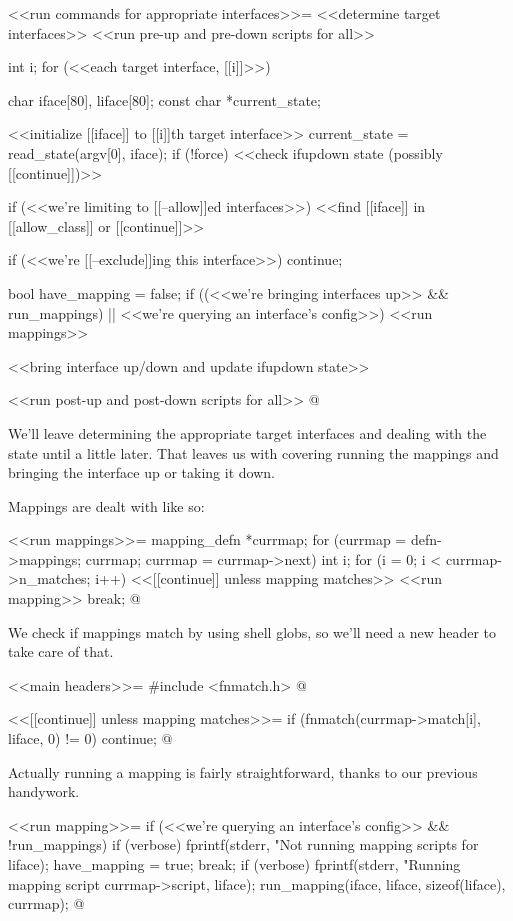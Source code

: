 \documentclass{article}
\begin{document}
<<run commands for appropriate interfaces>>=
<<determine target interfaces>>
<<run pre-up and pre-down scripts for all>>
{
	int i;
	for (<<each target interface, [[i]]>>) {
		char iface[80], liface[80];
		const char *current_state;

		<<initialize [[iface]] to [[i]]th target interface>>
		current_state = read_state(argv[0], iface);
		if (!force) {
			<<check ifupdown state (possibly [[continue]])>>
		}

		if (<<we're limiting to [[--allow]]ed interfaces>>) {
			<<find [[iface]] in [[allow_class]] or [[continue]]>>
		}

		if (<<we're [[--exclude]]ing this interface>>)  
			continue;

		bool have_mapping = false;
		if ((<<we're bringing interfaces up>> && run_mappings) || <<we're querying an interface's config>>) {
			<<run mappings>>
		}

		<<bring interface up/down and update ifupdown state>>
	}
}
<<run post-up and post-down scripts for all>>
@

We'll leave determining the appropriate target interfaces and dealing
with the state until a little later. That leaves us with covering running
the mappings and bringing the interface up or taking it down.

Mappings are dealt with like so:

<<run mappings>>=
{
	mapping_defn *currmap;
	for (currmap = defn->mappings; currmap; currmap = currmap->next) {
		int i;
		for (i = 0; i < currmap->n_matches; i++) {
			<<[[continue]] unless mapping matches>>
			<<run mapping>>
			break;
		}
	}
}
@

We check if mappings match by using shell globs, so we'll need a new header
to take care of that.

<<main headers>>=
#include <fnmatch.h>
@ 

<<[[continue]] unless mapping matches>>=
if (fnmatch(currmap->match[i], liface, 0) != 0)
	continue;
@

Actually running a mapping is fairly straightforward, thanks to our
previous handywork.

<<run mapping>>=
if (<<we're querying an interface's config>> && !run_mappings) {
	if (verbose) {
		fprintf(stderr, "Not running mapping scripts for %
			liface);
	}
	have_mapping = true;
	break;
}
if (verbose) {
	fprintf(stderr, "Running mapping script %
		currmap->script, liface);
}
run_mapping(iface, liface, sizeof(liface), currmap);
@
\end{document}

